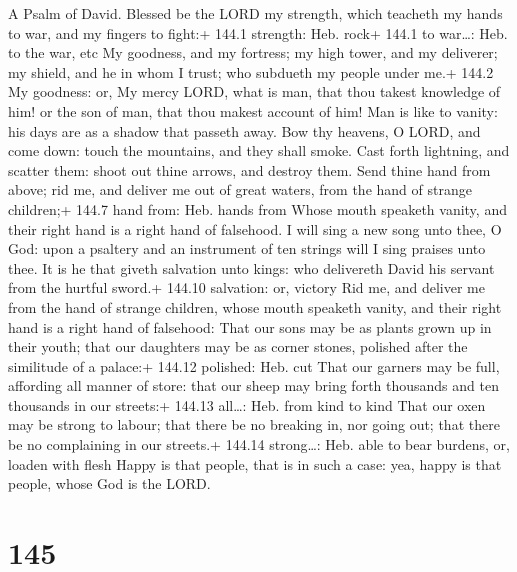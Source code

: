 A Psalm of David.  Blessed be the LORD my strength, which
teacheth my hands to war, and my fingers to fight:+ 144.1 strength: Heb.
rock+ 144.1 to war\ldots: Heb. to the war, etc  My goodness,
and my fortress; my high tower, and my deliverer; my shield, and he in
whom I trust; who subdueth my people under me.+ 144.2 My goodness: or,
My mercy  LORD, what is man, that thou takest knowledge of
him! or the son of man, that thou makest account of him! 
Man is like to vanity: his days are as a shadow that passeth away.
 Bow thy heavens, O LORD, and come down: touch the
mountains, and they shall smoke.  Cast forth lightning, and
scatter them: shoot out thine arrows, and destroy them. 
Send thine hand from above; rid me, and deliver me out of great waters,
from the hand of strange children;+ 144.7 hand from: Heb. hands from
 Whose mouth speaketh vanity, and their right hand is a
right hand of falsehood.  I will sing a new song unto thee,
O God: upon a psaltery and an instrument of ten strings will I sing
praises unto thee.  It is he that giveth salvation unto
kings: who delivereth David his servant from the hurtful sword.+ 144.10
salvation: or, victory  Rid me, and deliver me from the
hand of strange children, whose mouth speaketh vanity, and their right
hand is a right hand of falsehood:  That our sons may be as
plants grown up in their youth; that our daughters may be as corner
stones, polished after the similitude of a palace:+ 144.12 polished:
Heb. cut  That our garners may be full, affording all
manner of store: that our sheep may bring forth thousands and ten
thousands in our streets:+ 144.13 all\ldots: Heb. from kind to kind
 That our oxen may be strong to labour; that there be no
breaking in, nor going out; that there be no complaining in our
streets.+ 144.14 strong\ldots: Heb. able to bear burdens, or, loaden
with flesh  Happy is that people, that is in such a case:
yea, happy is that people, whose God is the LORD.

\hypertarget{section-145}{%
\section{145}\label{section-145}}

